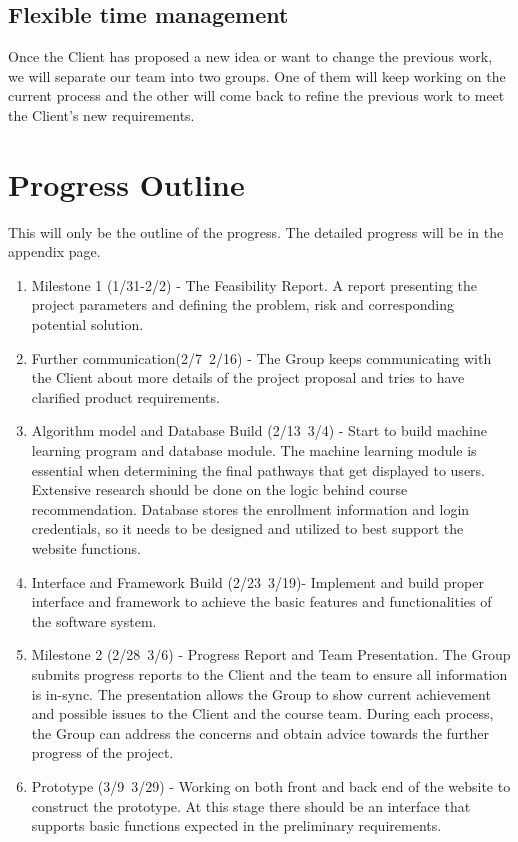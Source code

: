 \documentclass{article}
\begin{document}
\subsection{Flexible time management}
Once the Client has proposed a new idea or want to change the previous work, we will separate our team into two groups. One of them will keep working on the current process and the other will come back to refine the previous work to meet the Client’s new requirements. 

\section{Progress Outline}
This will only be the outline of the progress. The detailed progress will be in the appendix page.

\begin{enumerate}[I]
    \item Milestone 1 (1/31-2/2) - The Feasibility Report. A report presenting the project parameters and defining the problem, risk and corresponding potential solution.
    \item Further communication(2/7~2/16) -  The Group keeps communicating with the Client about more details of the project proposal and tries to have clarified product requirements.
    \item Algorithm model and Database Build (2/13~3/4) - Start to build machine learning program and database module. The machine learning module is essential when determining the final pathways that get displayed to users. Extensive research should be done on the logic behind course recommendation. Database stores the enrollment information and login credentials, so it needs to be designed and utilized to best support the website functions. 
    \item Interface and Framework Build (2/23~3/19)- Implement and build proper interface and framework to achieve the basic features and functionalities of the software system.
    \item Milestone 2 (2/28~3/6)  - Progress Report and Team Presentation. The Group submits progress reports to the Client and the team to ensure all information is in-sync. The presentation allows the Group to show current achievement and possible issues to the Client and the course team. During each process, the Group can address the concerns and obtain advice towards the further progress of the project.
    \item Prototype (3/9~3/29) - Working on both front and back end of the website to construct the prototype. At this stage there should be an interface that supports basic functions expected in the preliminary requirements.

\end{enumerate}
\end{document}

